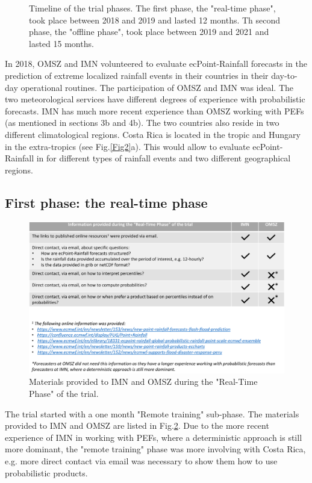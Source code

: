 \documentclass[twocol]{ametsocV5} %
\begin{document}
\begin{figure}
\caption{Timeline of the trial phases. The first phase, the "real-time phase", took place between 2018 and 2019 and lasted 12 months. Th second phase, the "offline phase", took place between 2019 and 2021 and lasted 15 months.}
\label{FlowChart}
\end{figure}



In 2018, OMSZ and IMN volunteered to evaluate ecPoint-Rainfall forecasts in the prediction of extreme localized rainfall events in their countries in their day-to-day operational routines. The participation of OMSZ and IMN was ideal. The two meteorological services have different degrees of experience with probabilistic forecasts. IMN has much more recent experience than OMSZ working with PEFs (as mentioned in sections 3b and 4b). The two countries also reside in two different climatological regions. Costa Rica is located in the tropic and Hungary in the extra-tropics (see Fig.\ref{Fig2}a). This would allow to evaluate ecPoint-Rainfall in for different types of rainfall events and two different geographical regions.

\subsection{First phase: the real-time phase}
 \begin{figure}
\centerline{\includegraphics[width=39pc]{manuscript/Figures/Fig5.png}}
\caption{Materials provided to IMN and OMSZ during the "Real-Time Phase" of the trial. }
\label{Fig5}
\end{figure}
 
The trial started with a one month "Remote training" sub-phase. The materials provided to IMN and OMSZ are listed in Fig.\ref{Fig5}. Due to the more recent experience of IMN in working with PEFs, where a deterministic approach is still more dominant, the "remote training" phase was more involving with Costa Rica, e.g. more direct contact via email was necessary to show them how to use probabilistic products.\par  
\end{document}
